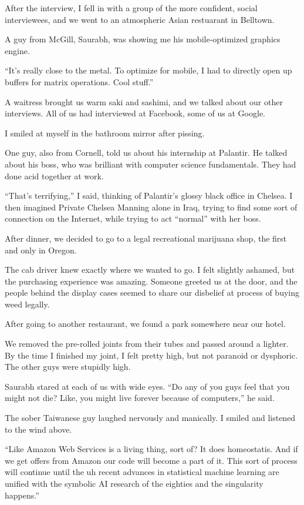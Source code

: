 After the interview, I fell in with a group of the more confident, social
interviewees, and we went to an atmospheric Asian restuarant in Belltown.

A guy from McGill, Saurabh, was showing me his mobile-optimized graphics engine.

``It's really close to the metal.  To optimize for mobile, I had to directly
open up buffers for matrix operations.  Cool stuff.''

A waitress brought us warm saki and sashimi, and we talked about our other
interviews.  All of us had interviewed at Facebook, some of us at Google.  

I smiled at myself in the bathroom mirror after pissing.

One guy, also from Cornell, told us about his internship at Palantir.  He talked
about his boss, who was brilliant with computer science fundamentals.  They had
done acid together at work.

``That's terrifying,'' I said, thinking of Palantir's glossy black office in
Chelsea.  I then imagined Private Chelsea Manning alone in Iraq, trying to find
some sort of connection on the Internet, while trying to act ``normal'' with her
boss.

After dinner, we decided to go to a legal recreational marijuana shop, the first
and only in Oregon.

The cab driver knew exactly where we wanted to go.  I felt slightly ashamed, but
the purchasing experience was amazing.  Someone greeted us at the door, and the
people behind the display cases seemed to share our disbelief at process
of buying weed legally.

After going to another restaurant, we found a park somewhere near our hotel.

We removed the pre-rolled joints from their tubes and passed around a lighter.
By the time I finished my joint, I felt pretty high, but not paranoid or
dysphoric.  The other guys were stupidly high.

Saurabh stared at each of us with wide eyes.  ``Do any of you guys feel that you
might not die?  Like, you might live forever because of computers,'' he said.

The sober Taiwanese guy laughed nervously and manically.  I smiled and listened
to the wind above.

``Like Amazon Web Services is a living thing, sort of?  It does homeostatis.
And if we get offers from Amazon our code will become a part of it.  This sort
of process will continue until the uh recent advances in statistical machine
learning are unified with the symbolic AI research of the eighties and the
singularity happens.''

